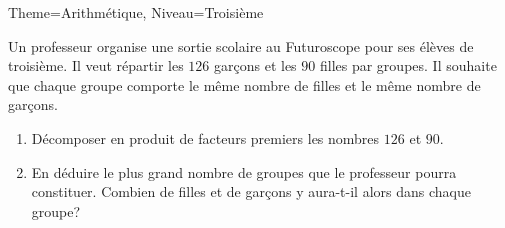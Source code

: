 \documentclass[11pt]{article}
\begin{document}
\begin{multicols}{2}
\begin{Maquette}[Fiche]{Theme=Arithmétique, Niveau=Troisième}
\begin{exercice}[Source=DNB Juin 2025 Asie]
        \end{exercice}

        \columnbreak

        \begin{exercice}[Source=DNB Juin 2021 Métropole]
            Un professeur organise une sortie scolaire au Futuroscope pour ses élèves de troisième. Il veut répartir les $126$ garçons et les $90$ filles par groupes. Il souhaite que chaque groupe comporte le même nombre de filles et le même nombre de garçons.
            \begin{enumerate}
                \item Décomposer en produit de facteurs premiers les nombres $126$ et $90$.
                \item En déduire le plus grand nombre de groupes que le professeur pourra
                      constituer. Combien de filles et de garçons y aura-t-il alors dans chaque groupe?
            \end{enumerate}
        \end{exercice}


\end{Maquette}
\end{multicols}
\end{document}
